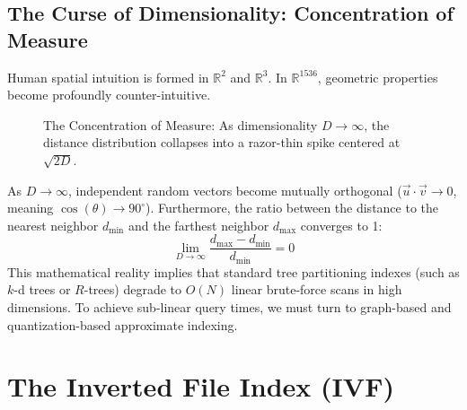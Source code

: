 \subsection{The Curse of Dimensionality: Concentration of Measure}
Human spatial intuition is formed in $\mathbb{R}^2$ and $\mathbb{R}^3$. In $\mathbb{R}^{1536}$, geometric properties become profoundly counter-intuitive.

\begin{figure}[htbp]
\centering
{}
\caption{The Concentration of Measure: As dimensionality $D \to \infty$, the distance distribution collapses into a razor-thin spike centered at $\sqrt{2D}$.}
\label{fig:concentration_of_measure}
\end{figure}

As $D \to \infty$, independent random vectors become mutually orthogonal ($\vec{u} \cdot \vec{v} \to 0$, meaning $\cos(\theta) \to 90^\circ$). Furthermore, the ratio between the distance to the nearest neighbor $d_{\min}$ and the farthest neighbor $d_{\max}$ converges to 1:
\begin{equation}
\lim_{D \to \infty} \frac{d_{\max} - d_{\min}}{d_{\min}} = 0
\end{equation}
This mathematical reality implies that standard tree partitioning indexes (such as $k$-d trees or $R$-trees) degrade to $O(N)$ linear brute-force scans in high dimensions. To achieve sub-linear query times, we must turn to graph-based and quantization-based approximate indexing.

\section{The Inverted File Index (IVF)}

